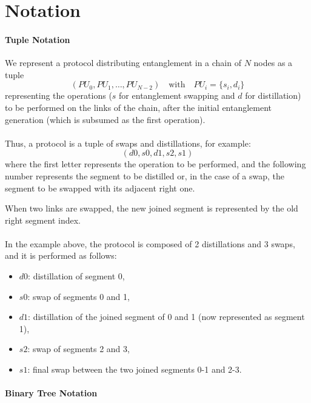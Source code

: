 \documentclass{article}
\begin{document}
\section*{Notation}

\paragraph*{Tuple Notation}

We represent a protocol distributing entanglement in a chain of $N$ nodes as a tuple
\begin{equation*}
  (PU_0, PU_1, \ldots, PU_{N-2}) \quad \text{with} \quad PU_i = \{s_i, d_i\}
\end{equation*}
representing the operations ($s$ for entanglement swapping and $d$ for distillation) to be performed on the links of the chain, after the initial entanglement generation (which is subsumed as the first operation).
\\\\
Thus, a protocol is a tuple of swaps and distillations, for example:
\begin{equation*}
    (d0, s0, d1, s2, s1)
\end{equation*}
where the first letter represents the operation to be performed, and the following number represents the segment to be distilled or, in the case of a swap, the segment to be swapped with its adjacent right one.

When two links are swapped, the new joined segment is represented by the old right segment index.
\\\\
In the example above, the protocol is composed of 2 distillations and 3 swaps, and it is performed as follows:
\begin{itemize}
    \item $d0$: distillation of segment 0,
    \item $s0$: swap of segments 0 and 1,
    \item $d1$: distillation of the joined segment of 0 and 1 (now represented as segment 1),
    \item $s2$: swap of segments 2 and 3,
    \item $s1$: final swap between the two joined segments 0-1 and 2-3.
\end{itemize}

\paragraph*{Binary Tree Notation}
\end{document}
